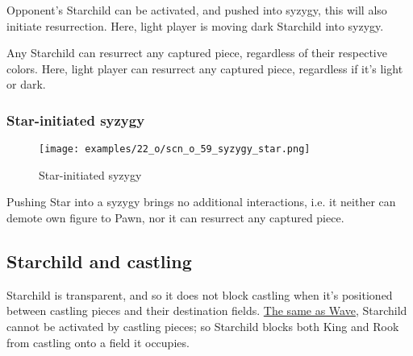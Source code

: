 Opponent's Starchild can be activated, and pushed into syzygy, this will also
initiate resurrection. Here, light player is moving dark Starchild into syzygy.

Any Starchild can resurrect any captured piece, regardless of their respective
colors. Here, light player can resurrect any captured piece, regardless if it's
light or dark.

\clearpage %

\subsubsection*{Star-initiated syzygy}
\label{sec:One/Starchild/Syzygy/Star-initiated syzygy}

\vspace*{-1.2\baselineskip}
\noindent
\begin{figure}[!h]
\texttt{[image: examples/22\_o/scn\_o\_59\_syzygy\_star.png]}
\caption{Star-initiated syzygy}
\label{fig:scn_o_59_syzygy_star}
\end{figure}

Pushing Star into a syzygy brings no additional interactions, i.e. it neither can
demote own figure to Pawn, nor it can resurrect any captured piece.

\clearpage %

\subsection*{Starchild and castling}
\label{sec:One/Starchild/Starchild and castling}

\vspace*{-0.4\baselineskip}
Starchild is transparent, and so it does not block castling when it's positioned
between castling pieces and their destination fields.
\hyperref[fig:scn_mv_11_wave_block_castling_rook]{The same as Wave},
Starchild cannot be activated by castling pieces; so Starchild blocks both King
and Rook from castling onto a field it occupies.


